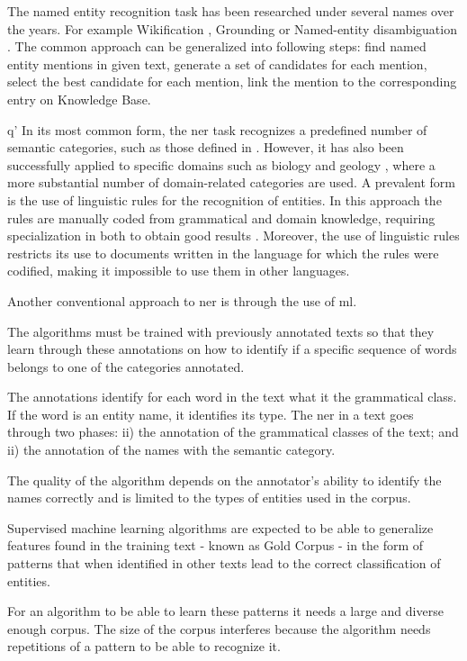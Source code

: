 The named entity recognition task has been researched under several names over the years. For example Wikification \cite{Ratinov:2011}, Grounding \cite{leidner2003grounding} or Named-entity disambiguation \cite{hoffart2011robust}. The common approach can be generalized into following steps: find named entity mentions in given text, generate a set of candidates for each mention, select the best candidate for each mention, link the mention to the corresponding entry on Knowledge Base.

q'
In its most common form, the \gls{ner} task recognizes a predefined number of semantic categories, such as those defined in \cite{grishman1996message}. However, it has also been successfully applied to specific domains such as biology \cite{campos2012biomedical} and geology \cite{sobhana2010conditional}, where a more substantial number of domain-related categories are used. A prevalent form is the use of linguistic rules for the recognition of entities. In this approach the rules are manually coded from grammatical and domain knowledge, requiring specialization in both to obtain good results \cite{nadeau2007survey}. Moreover, the use of linguistic rules restricts its use to documents written in the language for which the rules were codified, making it impossible to use them in other languages.

Another conventional approach to \gls{ner} is through the use of \gls{ml}.

The algorithms must be trained with previously annotated texts so that they learn through these annotations on how to identify if a specific sequence of words belongs to one of the categories annotated. 

The annotations identify for each word in the text what it the grammatical class. If the word is an entity name, it identifies its type. The \gls{ner} in a text goes through two phases: ii) the annotation of the grammatical classes of the text; and ii) the annotation of the names with the semantic category.

The quality of the algorithm depends on the annotator's ability to identify the names correctly and is limited to the types of entities used in the corpus. 

Supervised machine learning algorithms are expected to be able to generalize features found in the training text - known as Gold Corpus - in the form of patterns that when identified in other texts lead to the correct classification of entities. 

For an algorithm to be able to learn these patterns it needs a large and diverse enough corpus. The size of the corpus interferes because the algorithm needs repetitions of a pattern to be able to recognize it. 

